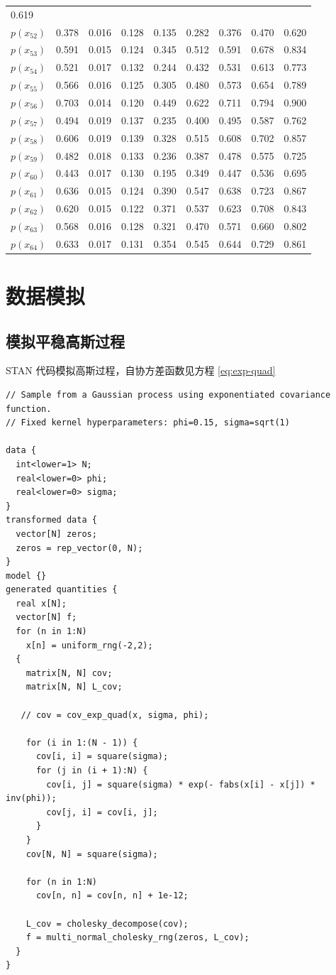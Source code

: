 \documentclass[12pt,a4paper,UTF8,twoside]{book}
\theoremstyle{definition}
\theoremstyle{definition}
\theoremstyle{definition}
\theoremstyle{remark}
\begin{document}
\begin{longtable}[]{@{}lrrrrrrrr@{}}
0.619\tabularnewline
\(p(x_{52})\) & 0.378 & 0.016 & 0.128 & 0.135 & 0.282 & 0.376 & 0.470 &
0.620\tabularnewline
\(p(x_{53})\) & 0.591 & 0.015 & 0.124 & 0.345 & 0.512 & 0.591 & 0.678 &
0.834\tabularnewline
\(p(x_{54})\) & 0.521 & 0.017 & 0.132 & 0.244 & 0.432 & 0.531 & 0.613 &
0.773\tabularnewline
\(p(x_{55})\) & 0.566 & 0.016 & 0.125 & 0.305 & 0.480 & 0.573 & 0.654 &
0.789\tabularnewline
\(p(x_{56})\) & 0.703 & 0.014 & 0.120 & 0.449 & 0.622 & 0.711 & 0.794 &
0.900\tabularnewline
\(p(x_{57})\) & 0.494 & 0.019 & 0.137 & 0.235 & 0.400 & 0.495 & 0.587 &
0.762\tabularnewline
\(p(x_{58})\) & 0.606 & 0.019 & 0.139 & 0.328 & 0.515 & 0.608 & 0.702 &
0.857\tabularnewline
\(p(x_{59})\) & 0.482 & 0.018 & 0.133 & 0.236 & 0.387 & 0.478 & 0.575 &
0.725\tabularnewline
\(p(x_{60})\) & 0.443 & 0.017 & 0.130 & 0.195 & 0.349 & 0.447 & 0.536 &
0.695\tabularnewline
\(p(x_{61})\) & 0.636 & 0.015 & 0.124 & 0.390 & 0.547 & 0.638 & 0.723 &
0.867\tabularnewline
\(p(x_{62})\) & 0.620 & 0.015 & 0.122 & 0.371 & 0.537 & 0.623 & 0.708 &
0.843\tabularnewline
\(p(x_{63})\) & 0.568 & 0.016 & 0.128 & 0.321 & 0.470 & 0.571 & 0.660 &
0.802\tabularnewline
\(p(x_{64})\) & 0.633 & 0.017 & 0.131 & 0.354 & 0.545 & 0.644 & 0.729 &
0.861\tabularnewline
\bottomrule
\end{longtable}

\hypertarget{simulate-code}{%
\section*{数据模拟}\label{simulate-code}}

\hypertarget{simulate-SGP-code}{%
\subsection{模拟平稳高斯过程}\label{simulate-SGP-code}}

STAN 代码模拟高斯过程，自协方差函数见方程 \ref{eq:exp-quad}

\begin{verbatim}
// Sample from a Gaussian process using exponentiated covariance function.
// Fixed kernel hyperparameters: phi=0.15, sigma=sqrt(1)

data {
  int<lower=1> N;
  real<lower=0> phi;
  real<lower=0> sigma;
}
transformed data {
  vector[N] zeros;
  zeros = rep_vector(0, N);
}
model {}
generated quantities {
  real x[N];
  vector[N] f;
  for (n in 1:N)
    x[n] = uniform_rng(-2,2);
  {
    matrix[N, N] cov;
    matrix[N, N] L_cov;
    
   // cov = cov_exp_quad(x, sigma, phi);

    for (i in 1:(N - 1)) {
      cov[i, i] = square(sigma);
      for (j in (i + 1):N) {
        cov[i, j] = square(sigma) * exp(- fabs(x[i] - x[j]) * inv(phi));
        cov[j, i] = cov[i, j];
      }
    }
    cov[N, N] = square(sigma); 
    
    for (n in 1:N)
      cov[n, n] = cov[n, n] + 1e-12;

    L_cov = cholesky_decompose(cov);
    f = multi_normal_cholesky_rng(zeros, L_cov);
  }
}
\end{verbatim}
\end{document}

